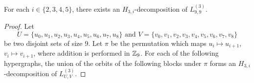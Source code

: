 \begin{subappendices}

\begin{example} \label{eg:H_3i-l99}
For each $i \in \{2,3,4,5\}$, there exists an $H_{3,i}$-decomposition of $L_{9,9}^{(3)}$.
\end{example}

\begin{proof}
Let
\[
    U = \{u_0, u_1, u_2, u_3, u_4, u_5, u_6, u_7, u_8\} \text{ and }
    V = \{v_0, v_1, v_2, v_3, v_4, v_5, v_6, v_7, v_8\}
\]
be two disjoint sets of size 9.
Let $\pi$ be the permutation which maps $u_i \mapsto u_{i+1}$, $v_i \mapsto v_{i+1}$, where addition is performed in $\mathbb{Z}_9$.
For each of the following hypergraphs, the union of the orbits of the following blocks under $\pi$ forms an $H_{3,i}$-decomposition of $L_{U,V}^{(3)}$.


\end{proof}
\end{subappendices}
